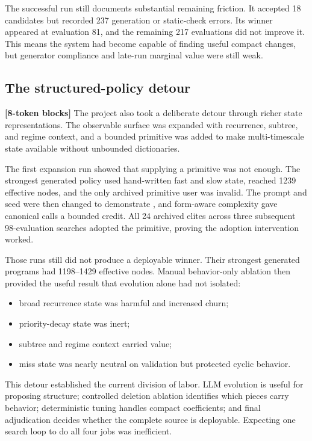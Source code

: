 \documentclass[11pt]{article}
\newcommand{\code}[1]{\texttt{\detokenize{#1}}}
\newcommand{\blocktag}[1]{\textbf{\color{navy}[#1-token blocks]}}
\begin{document}
The successful run still documents substantial remaining friction.  It accepted 18
candidates but recorded 237 generation or static-check errors.  Its winner appeared at
evaluation 81, and the remaining 217 evaluations did not improve it.  This means the
system had become capable of finding useful compact changes, but generator compliance
and late-run marginal value were still weak.

\subsection{The structured-policy detour}

\blocktag{8} The project also took a deliberate detour through richer state
representations.  The observable surface was expanded with recurrence, subtree, and regime context, and a
bounded \code{MultiTimescaleDecay} primitive was added to make multi-timescale state
available without unbounded dictionaries.

The first expansion run showed that supplying a primitive was not enough.  The
strongest generated policy used hand-written fast and slow state, reached 1239
effective nodes, and the only archived primitive user was invalid.  The prompt and seed
were then changed to demonstrate \code{observe_vector}, and form-aware complexity gave
canonical calls a bounded credit.  All 24 archived elites across three subsequent
98-evaluation searches adopted the primitive, proving the adoption intervention
worked.

Those runs still did not produce a deployable winner.  Their strongest generated
programs had 1198--1429 effective nodes.  Manual behavior-only ablation then provided
the useful result that evolution alone had not isolated:

\begin{itemize}
  \item broad recurrence state was harmful and increased churn;
  \item priority-decay state was inert;
  \item subtree and regime context carried value;
  \item miss state was nearly neutral on validation but protected cyclic behavior.
\end{itemize}

This detour established the current division of labor.  LLM evolution is useful for
proposing structure; controlled deletion ablation identifies which pieces carry
behavior; deterministic tuning handles compact coefficients; and final adjudication
decides whether the complete source is deployable.  Expecting one search loop to do
all four jobs was inefficient.
\end{document}
